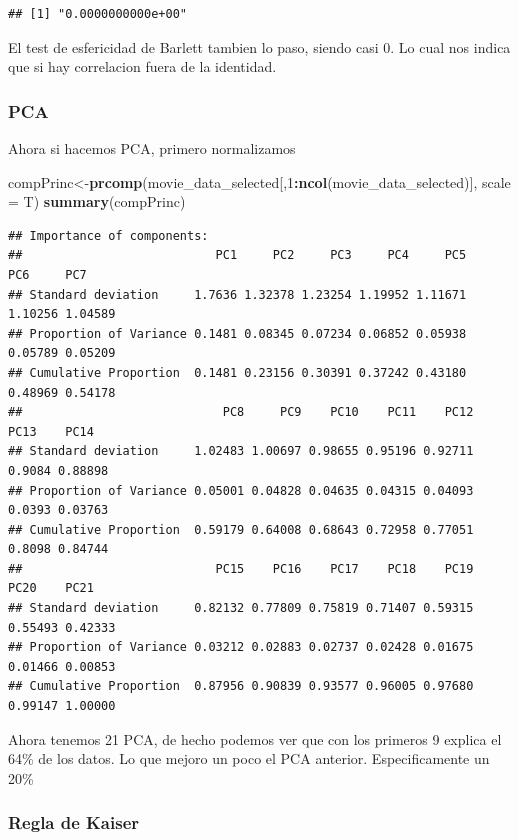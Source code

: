 \documentclass[
]{article}
\newenvironment{Shaded}{\begin{snugshade}}{\end{snugshade}}
\newcommand{\AttributeTok}[1]{\textcolor[rgb]{0.13,0.29,0.53}{#1}}
\newcommand{\DecValTok}[1]{\textcolor[rgb]{0.00,0.00,0.81}{#1}}
\newcommand{\FunctionTok}[1]{\textcolor[rgb]{0.13,0.29,0.53}{\textbf{#1}}}
\newcommand{\NormalTok}[1]{#1}
\newcommand{\OtherTok}[1]{\textcolor[rgb]{0.56,0.35,0.01}{#1}}
\newcommand{\SpecialCharTok}[1]{\textcolor[rgb]{0.81,0.36,0.00}{\textbf{#1}}}
\begin{document}
\begin{verbatim}
## [1] "0.0000000000e+00"
\end{verbatim}

El test de esfericidad de Barlett tambien lo paso, siendo casi 0. Lo
cual nos indica que si hay correlacion fuera de la identidad.

\subsubsection{PCA}\label{pca-2}

Ahora si hacemos PCA, primero normalizamos

\begin{Shaded}
\begin{Highlighting}[]
\NormalTok{compPrinc}\OtherTok{\textless{}{-}}\FunctionTok{prcomp}\NormalTok{(movie\_data\_selected[,}\DecValTok{1}\SpecialCharTok{:}\FunctionTok{ncol}\NormalTok{(movie\_data\_selected)], }\AttributeTok{scale =}\NormalTok{ T)}
\FunctionTok{summary}\NormalTok{(compPrinc)}
\end{Highlighting}
\end{Shaded}

\begin{verbatim}
## Importance of components:
##                           PC1     PC2     PC3     PC4     PC5     PC6     PC7
## Standard deviation     1.7636 1.32378 1.23254 1.19952 1.11671 1.10256 1.04589
## Proportion of Variance 0.1481 0.08345 0.07234 0.06852 0.05938 0.05789 0.05209
## Cumulative Proportion  0.1481 0.23156 0.30391 0.37242 0.43180 0.48969 0.54178
##                            PC8     PC9    PC10    PC11    PC12   PC13    PC14
## Standard deviation     1.02483 1.00697 0.98655 0.95196 0.92711 0.9084 0.88898
## Proportion of Variance 0.05001 0.04828 0.04635 0.04315 0.04093 0.0393 0.03763
## Cumulative Proportion  0.59179 0.64008 0.68643 0.72958 0.77051 0.8098 0.84744
##                           PC15    PC16    PC17    PC18    PC19    PC20    PC21
## Standard deviation     0.82132 0.77809 0.75819 0.71407 0.59315 0.55493 0.42333
## Proportion of Variance 0.03212 0.02883 0.02737 0.02428 0.01675 0.01466 0.00853
## Cumulative Proportion  0.87956 0.90839 0.93577 0.96005 0.97680 0.99147 1.00000
\end{verbatim}

Ahora tenemos 21 PCA, de hecho podemos ver que con los primeros 9
explica el 64\% de los datos. Lo que mejoro un poco el PCA anterior.
Especificamente un 20\%

\subsubsection{Regla de Kaiser}\label{regla-de-kaiser}
\end{document}
